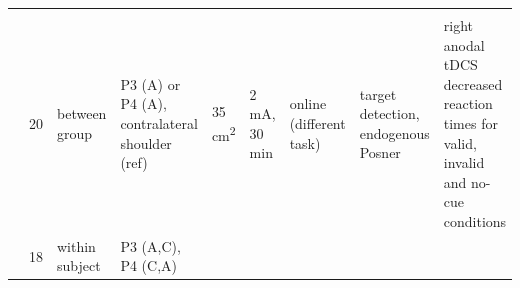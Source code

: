 \documentclass[11pt,english,]{memoir}
\begin{document}
\begin{longtable}[]{@{}lllllllll@{}}
\begin{minipage}[t]{0.11\columnwidth}
\strut
\end{minipage} & \begin{minipage}[t]{0.24\columnwidth}\raggedright
\strut
\end{minipage}\tabularnewline
\begin{minipage}[t]{0.12\columnwidth}\raggedright
\textcite{Bolognini2010}\strut
\end{minipage} & \begin{minipage}[t]{0.02\columnwidth}\raggedright
20\strut
\end{minipage} & \begin{minipage}[t]{0.04\columnwidth}\raggedright
between
group\strut
\end{minipage} & \begin{minipage}[t]{0.11\columnwidth}\raggedright
P3 (A) or P4 (A),
contralateral shoulder
(ref)\strut
\end{minipage} & \begin{minipage}[t]{0.03\columnwidth}\raggedright
35
cm\textsuperscript{2}\strut
\end{minipage} & \begin{minipage}[t]{0.05\columnwidth}\raggedright
2 mA, 30
min\strut
\end{minipage} & \begin{minipage}[t]{0.05\columnwidth}\raggedright
online
(different
task)\strut
\end{minipage} & \begin{minipage}[t]{0.11\columnwidth}\raggedright
target detection,
endogenous Posner\strut
\end{minipage} & \begin{minipage}[t]{0.24\columnwidth}\raggedright
right anodal tDCS decreased reaction times for valid,
invalid and no-cue conditions\strut
\end{minipage}\tabularnewline
\begin{minipage}[t]{0.12\columnwidth}\raggedright
\textcite{Li2015a}\strut
\end{minipage} & \begin{minipage}[t]{0.02\columnwidth}\raggedright
18\strut
\end{minipage} & \begin{minipage}[t]{0.04\columnwidth}\raggedright
within
subject\strut
\end{minipage} & \begin{minipage}[t]{0.11\columnwidth}\raggedright
P3 (A,C), P4 (C,A)\strut
\end{minipage} & \begin{minipage}[t]{0.03\columnwidth}\raggedright

\end{minipage}
\end{longtable}
\end{document}
